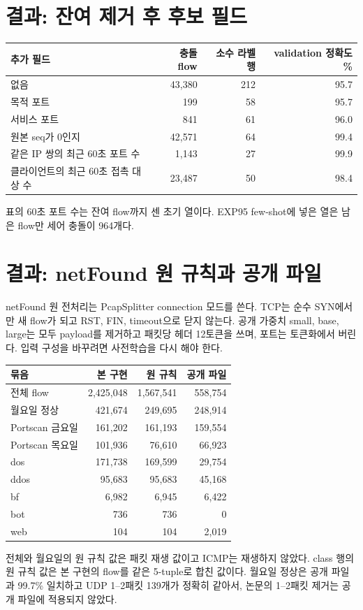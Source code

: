 \section{결과: 잔여 제거 후 후보 필드}
\begin{center}\small
\begin{tabular}{lrrr}
\toprule
추가 필드 & 충돌 flow & 소수 라벨 행 & validation 정확도 \%\\\midrule
없음 & 43,380 & 212 & 95.7\\
목적 포트 & 199 & 58 & 95.7\\
서비스 포트 & 841 & 61 & 96.0\\
원본 seq가 0인지 & 42,571 & 64 & 99.4\\
같은 IP 쌍의 최근 60초 포트 수 & 1,143 & 27 & 99.9\\
클라이언트의 최근 60초 접촉 대상 수 & 23,487 & 50 & 98.4\\
\bottomrule
\end{tabular}
\end{center}
표의 60초 포트 수는 잔여 flow까지 센 초기 열이다. EXP95 few-shot에 넣은 열은 남은 flow만 세어 충돌이 964개다.

\section{결과: netFound 원 규칙과 공개 파일}
netFound 원 전처리는 PcapSplitter connection 모드를 쓴다. TCP는 순수 SYN에서만 새 flow가 되고 RST, FIN, timeout으로 닫지 않는다. 공개 가중치 small, base, large는 모두 payload를 제거하고 패킷당 헤더 12토큰을 쓰며, 포트는 토큰화에서 버린다. 입력 구성을 바꾸려면 사전학습을 다시 해야 한다.

\begin{center}\small
\begin{tabular}{lrrr}
\toprule
묶음 & 본 구현 & 원 규칙 & 공개 파일\\\midrule
전체 flow & 2,425,048 & 1,567,541 & 558,754\\
월요일 정상 & 421,674 & 249,695 & 248,914\\
Portscan 금요일 & 161,202 & 161,193 & 159,554\\
Portscan 목요일 & 101,936 & 76,610 & 66,923\\
dos & 171,738 & 169,599 & 29,754\\
ddos & 95,683 & 95,683 & 45,168\\
bf & 6,982 & 6,945 & 6,422\\
bot & 736 & 736 & 0\\
web & 104 & 104 & 2,019\\
\bottomrule
\end{tabular}
\end{center}
전체와 월요일의 원 규칙 값은 패킷 재생 값이고 ICMP는 재생하지 않았다. class 행의 원 규칙 값은 본 구현의 flow를 같은 5-tuple로 합친 값이다. 월요일 정상은 공개 파일과 99.7\% 일치하고 UDP 1--2패킷 139개가 정확히 같아서, 논문의 1--2패킷 제거는 공개 파일에 적용되지 않았다.

